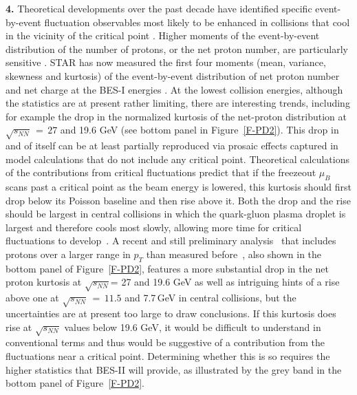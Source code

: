 {\bf 4.} Theoretical developments over the past decade have identified
specific event-by-event fluctuation observables most likely to be
enhanced in collisions that cool in the vicinity of the critical point
\cite{Stephanov:2008qz,Athanasiou:2010kw}. Higher moments of the
event-by-event distribution of the number of protons, or the net
proton number, are particularly sensitive 
\cite{Ejiri:2005wq,Athanasiou:2010kw,Karsch:2010ck}. STAR has now 
measured the first four moments (mean, variance, skewness and kurtosis) 
of the event-by-event distribution of net proton number and net charge at 
the BES-I energies \cite{Adamczyk:2013dal,Adamczyk:2014fia}. At the 
lowest collision energies, although the statistics are at present rather
limiting, there are interesting trends, including for example the drop in the
normalized kurtosis of the net-proton distribution at $\sqrt{s_{NN}}{\,=\,}27$
and 19.6 GeV (see bottom panel in Figure~\ref{F-PD2}). This drop in and 
of itself can be at least partially reproduced via prosaic effects captured 
in model calculations that do not include any critical point. Theoretical 
calculations of the contributions from critical fluctuations predict  
\cite{Stephanov:2011pb} that if the freezeout $\mu_B$ scans past a 
critical point as the beam energy is lowered, this kurtosis should first 
drop below its Poisson baseline and then rise above it. Both the drop 
and the rise should be largest in central collisions in which the 
quark-gluon plasma droplet is largest and therefore cools most slowly, 
allowing more time for critical fluctuations to develop~\cite{Berdnikov:1999ph}. 
A recent and still preliminary analysis~\cite{CPODKurtosis} 
that includes protons over a larger range in $p_T$ than measured before~\cite{Adamczyk:2013dal},
also shown in the bottom panel of 
Figure~\ref{F-PD2}, 
features a more substantial drop in the net proton kurtosis at $\sqrt{s_{NN}}$= 27 and 19.6 GeV
as well as intriguing hints of a rise above one at 
$\sqrt{s_{NN}}{\,=\,}11.5$ and  7.7\,GeV in central collisions, 
but the uncertainties are at present too 
large to draw conclusions. If this kurtosis does rise at $\sqrt{s_{NN}}$ 
values below 19.6 GeV, it would be difficult to understand in 
conventional terms and thus would be suggestive of a contribution 
from the fluctuations near a critical point. Determining whether this 
is so requires the higher statistics that BES-II will provide, as illustrated
by the grey band in the bottom panel of Figure~\ref{F-PD2}. 

